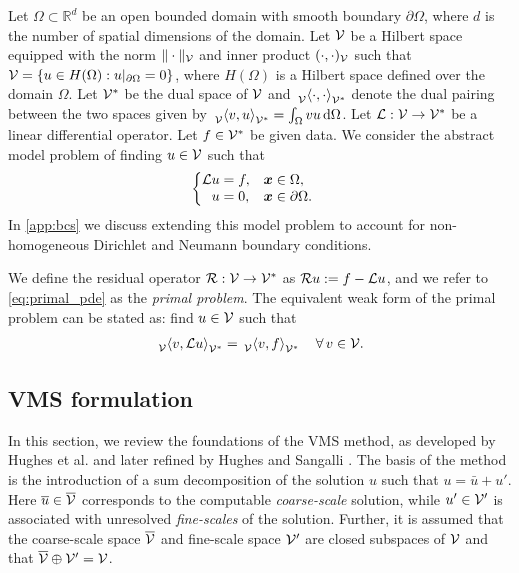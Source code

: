 Let $\Omega \subset \mathbb{R}^d$
be an open bounded domain with smooth boundary
$\partial \Omega$, where $d$ is the number
of spatial dimensions of the domain. Let
$\mathcal{V}$ be a Hilbert space equipped with
the norm $\| \cdot \|_{\mathcal{V}}$ and inner product
$( \cdot, \cdot) _{\mathcal{V}}$ such that
$ \mathcal{V} = \{ u \in H(\Omega) : u|_{\partial \Omega} = 0 \} $,
where $H(\Omega)$ is a Hilbert space defined over
the domain $\Omega$.
Let $\mathcal{V}^*$ be the dual space of $\mathcal{V}$ and
$\,{}_{\mathcal{V}}^{}\!\left< {\cdot}, {\cdot} \right>_{\mathcal{V}^*}$ denote the dual pairing
between the two spaces given by
$\,{}_{\mathcal{V}}^{}\!\left< {v}, {u} \right>_{\mathcal{V}^*} = \int_{\Omega} v u \, \text{d} \Omega$.
Let $\mathcal{L} : \mathcal{V} \to \mathcal{V}^*$
be a linear differential
operator. Let $f \in \mathcal{V}^*$ be given data.
We consider the abstract model problem of
finding $u \in \mathcal{V}$ such that
%
\begin{gather}
\begin{cases}
\begin{aligned}
\mathcal{L} u &= f, & & \boldsymbol{x} \in \Omega, \\
u &= 0, & & \boldsymbol{x} \in \partial \Omega.
\end{aligned}
\end{cases}
\label{eq:primal_pde}
\end{gather}
%
In \ref{app:bcs} we discuss extending this model
problem to account for non-homogeneous Dirichlet and
Neumann boundary conditions.

We define the residual operator
$\mathcal{R} : \mathcal{V} \to \mathcal{V}^*$ as
$\mathcal{R} u:= f - \mathcal{L} u$, and we refer to \eqref{eq:primal_pde}
as the \emph{primal problem}. The equivalent weak
form of the primal problem can be stated as:
find $u \in \mathcal{V}$ such that
%
\begin{gather}
\,{}_{\mathcal{V}}^{}\!\left< {v}, {\mathcal{L} u} \right>_{\mathcal{V}^*} = \,{}_{\mathcal{V}}^{}\!\left< {v}, {f} \right>_{\mathcal{V}^*}
\quad \forall \, v \in \mathcal{V}.
\label{eq:primal_weak}
\end{gather}

\subsection{VMS formulation}

In this section, we review the foundations of the
VMS method, as developed by Hughes et al.
\cite{hughes1998variational} and later refined by
Hughes and Sangalli \cite{hughes2007variational}.
The basis of the method is the introduction
of a sum decomposition of the solution $u$ such
that $u = \bar{u} + u'$. Here $\overline{u} \in \overline{\mathcal{V}}$
corresponds to the computable \emph{coarse-scale}
solution, while $u' \in \mathcal{V}'$ is associated with
unresolved \emph{fine-scales} of the solution.
Further, it is assumed that the coarse-scale
space $\overline{\mathcal{V}}$ and fine-scale space $\mathcal{V}'$
are closed subspaces of $\mathcal{V}$ and that
$\overline{\mathcal{V}} \oplus \mathcal{V}' = \mathcal{V}$.

